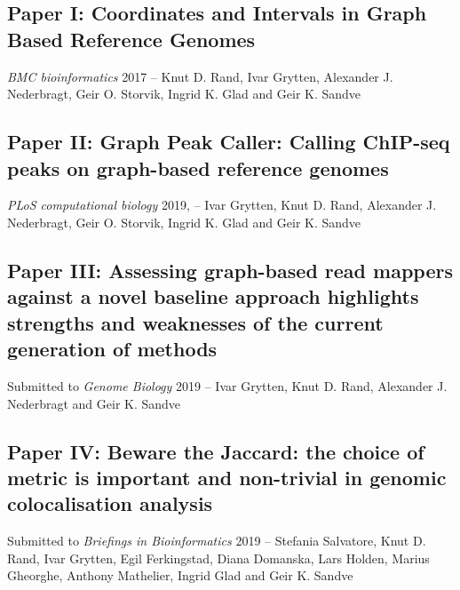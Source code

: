 \subsection*{Paper I: Coordinates and Intervals in Graph Based Reference Genomes}
\emph{BMC bioinformatics} 2017 --
Knut D. Rand, Ivar Grytten, Alexander J. Nederbragt, Geir O. Storvik, Ingrid K. Glad and Geir K. Sandve


% 

\subsection*{Paper II: Graph Peak Caller: Calling ChIP-seq peaks on graph-based reference genomes}
\emph{PLoS computational biology} 2019, --
Ivar Grytten, Knut D. Rand, Alexander J. Nederbragt, Geir O. Storvik, Ingrid K. Glad and Geir K. Sandve


\subsection*{Paper III: Assessing graph-based read mappers against a novel baseline approach highlights strengths and weaknesses of the current generation of methods}
Submitted to \emph{Genome Biology} 2019 -- Ivar Grytten, Knut D. Rand, Alexander J. Nederbragt and Geir K. Sandve
\subsection*{Paper IV: Beware the Jaccard: the choice of metric is important and non-trivial in genomic colocalisation analysis}
Submitted to \emph{Briefings in Bioinformatics} 2019 -- Stefania Salvatore, Knut D. Rand, Ivar Grytten, Egil Ferkingstad, Diana Domanska, Lars Holden, Marius Gheorghe, Anthony Mathelier, Ingrid Glad and Geir K. Sandve

